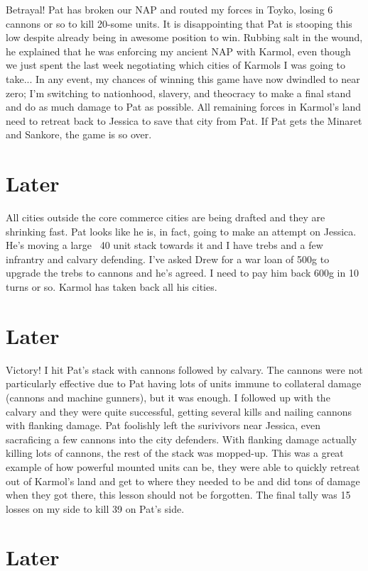 \documentclass[10pt]{article}
\begin{document}
Betrayal! Pat has broken our NAP and routed my forces in Toyko, losing
6 cannons or so to kill 20-some units. It is disappointing that Pat is
stooping this low despite already being in awesome position to
win. Rubbing salt in the wound, he explained that he was enforcing my
ancient NAP with Karmol, even though we just spent the last week
negotiating which cities of Karmols I was going to take... In any
event, my chances of winning this game have now dwindled to near zero;
I'm switching to nationhood, slavery, and theocracy to make a final
stand and do as much damage to Pat as possible. All remaining forces
in Karmol's land need to retreat back to Jessica to save that city
from Pat. If Pat gets the Minaret and Sankore, the game is so over.

\section*{Later}

All cities outside the core commerce cities are being drafted and they
are shrinking fast. Pat looks like he is, in fact, going to make an
attempt on Jessica. He's moving a large ~40 unit stack towards it and
I have trebs and a few infrantry and calvary defending. I've asked
Drew for a war loan of 500g to upgrade the trebs to cannons and he's
agreed. I need to pay him back 600g in 10 turns or so. Karmol has
taken back all his cities.

\section*{Later}

Victory! I hit Pat's stack with cannons followed by calvary. The
cannons were not particularly effective due to Pat having lots of
units immune to collateral damage (cannons and machine gunners), but
it was enough. I followed up with the calvary and they were quite
successful, getting several kills and nailing cannons with flanking
damage. Pat foolishly left the surivivors near Jessica, even
sacraficing a few cannons into the city defenders. With flanking
damage actually killing lots of cannons, the rest of the stack was
mopped-up. This was a great example of how powerful mounted units can
be, they were able to quickly retreat out of Karmol's land and get to
where they needed to be and did tons of damage when they got there,
this lesson should not be forgotten. The final tally was 15 losses on
my side to kill 39 on Pat's side.

\section*{Later}
\end{document}
